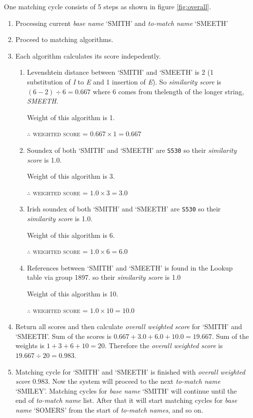 One matching cycle consists of 5 steps as shown in figure \ref{fig:overall}.

\begin{enumerate}
  \item Processing current \emph{base name} `SMITH' and \emph{to-match name} `SMEETH'
  \item Proceed to matching algorithms.
  \item Each algorithm calculates its score indepedently.
    \begin{enumerate}
      \item Levenshtein distance between `SMITH' and `SMEETH' is 2
        (1 substitution of \emph{I} to \emph{E} and 1 insertion of \emph{E}).
        So \emph{similarity score} is $(6 - 2) \div 6 = 0.667$ where 6 comes from thelength of the
        longer string, \emph{SMEETH}.

        Weight of this algorithm is 1.

        \textsc{$\therefore$ weighted score = $0.667 \times 1 = 0.667$}
      \item Soundex of both `SMITH' and `SMEETH' are \texttt{S530} so their
        \emph{similarity score} is 1.0.

        Weight of this algorithm is 3.

        \textsc{$\therefore$ weighted score = $1.0 \times 3 = 3.0$}
      \item Irish soundex of both `SMITH' and `SMEETH' are \texttt{S530} so their
        \emph{similarity score} is 1.0.

        Weight of this algorithm is 6.

        \textsc{$\therefore$ weighted score = $1.0 \times 6 = 6.0$}
      \item References between `SMITH' and `SMEETH' is found in the
        Lookup table via group 1897. so their \emph{similarity score} is 1.0

        Weight of this algorithm is 10.

        \textsc{$\therefore$ weighted score = $1.0 \times 10 = 10.0$}
    \end{enumerate}
  \item Return all scores and then calculate \emph{overall weighted score}
    for `SMITH' and `SMEETH'. Sum of the scores is
    $0.667 + 3.0 + 6.0 + 10.0 = 19.667$. Sum of the weights is
    $1 + 3 + 6 + 10 = 20$. Therefore the \emph{overall weighted score} is
    $19.667 \div 20 = 0.983$.
  \item Matching cycle for `SMITH' and `SMEETH' is finished with
    \emph{overall weighted score} 0.983.
    Now the system will proceed to the next \emph{to-match name} `SMILEY'.
    Matching cycles for \emph{base name} `SMITH' will continue until
    the end of \emph{to-match name} list. After that it will start
    matching cycles for \emph{base name} `SOMERS' from the start of
    \emph{to-match names}, and so on.
\end{enumerate}

